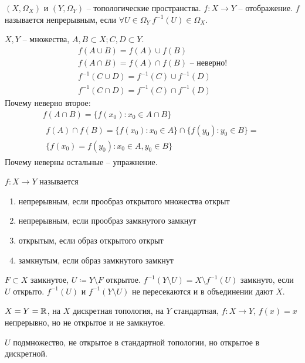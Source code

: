 \documentclass[main]{subfiles}
\begin{document}
\begin{definition}
    $(X, \Omega_X)$ и $(Y, \Omega_Y)$ -- топологические пространства.
    $f: X \to Y$ -- отображение.
    $f$ называется непрерывным, если $\forall U \in \Omega_Y\ f^{-1}(U) \in \Omega_X$.
\end{definition}

\begin{remark}
    $X, Y$ -- множества, $A, B \subset X; C, D \subset Y$.
    \begin{gather*}
        f(A \cup B) = f(A) \cup f(B)\\
        f(A \cap B) = f(A) \cap f(B)\text{ -- неверно!}\\
        f^{-1} (C \cup D) = f^{-1}(C) \cup f^{-1}(D)\\
        f^{-1} (C \cap D) = f^{-1}(C) \cap f^{-1}(D)
    \end{gather*}
    Почему неверно второе:
    \begin{gather*}
        f(A \cap B) = \{f(x_0) : x_0 \in A \cap B\} \\
        \begin{multlined}
            f(A) \cap f(B) = \{f(x_0) : x_0 \in A\} \cap \{f(y_0) : y_0 \in B\} =\\
            \{f(x_0) = f(y_0) : x_0 \in A, y_0 \in B\}
        \end{multlined}
    \end{gather*}
    Почему неверны остальные -- упражнение.
\end{remark}

\begin{definition}
    $f: X \to Y$ называется
    \begin{enumerate}
        \item непрерывным,  если прообраз открытого множества открыт
        \item непрерывным, если прообраз замкнутого замкнут
        \item открытым, если образ открытого открыт
        \item замкнутым, если образ замкнутого замкнут
    \end{enumerate}
\end{definition}

$F \subset X$ замкнутое, $U \coloneqq Y \setminus F$ открытое.
$f^{-1} (Y\setminus U) = X \setminus f^{-1}(U)$ замкнуто, если $U$ открыто.
$f^{-1} (U)$ и $f^{-1}(Y \setminus U )$ не пересекаются и в объединении дают $X$.

\begin{example}
    $X=Y=\mathbb{R}$, на $X$ дискретная топология, на $Y$ стандартная, $f: X \to Y$, $f(x) = x$ непрерывно,
    но не открытое и не замкнутое.

    $U$ подмножество, не открытое в стандартной топологии, но открытое в дискретной.
\end{example}
\end{document}
